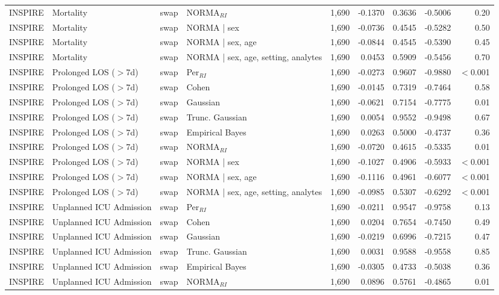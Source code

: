 \begin{table}[ht]
\begin{tabular}{ll l l r r r r r}
INSPIRE & Mortality & swap & NORMA$_{RI}$ & 1,690 & -0.1370 & 0.3636 & -0.5006 & 0.20 \\
INSPIRE & Mortality & swap & NORMA | sex & 1,690 & -0.0736 & 0.4545 & -0.5282 & 0.50 \\
INSPIRE & Mortality & swap & NORMA | sex, age & 1,690 & -0.0844 & 0.4545 & -0.5390 & 0.45 \\
INSPIRE & Mortality & swap & NORMA | sex, age, setting, analytes & 1,690 & 0.0453 & 0.5909 & -0.5456 & 0.70 \\
INSPIRE & Prolonged LOS ($>$7d) & swap & Per$_{RI}$ & 1,690 & -0.0273 & 0.9607 & -0.9880 & $<$0.001 \\
INSPIRE & Prolonged LOS ($>$7d) & swap & Cohen & 1,690 & -0.0145 & 0.7319 & -0.7464 & 0.58 \\
INSPIRE & Prolonged LOS ($>$7d) & swap & Gaussian & 1,690 & -0.0621 & 0.7154 & -0.7775 & 0.01 \\
INSPIRE & Prolonged LOS ($>$7d) & swap & Trunc. Gaussian & 1,690 & 0.0054 & 0.9552 & -0.9498 & 0.67 \\
INSPIRE & Prolonged LOS ($>$7d) & swap & Empirical Bayes & 1,690 & 0.0263 & 0.5000 & -0.4737 & 0.36 \\
INSPIRE & Prolonged LOS ($>$7d) & swap & NORMA$_{RI}$ & 1,690 & -0.0720 & 0.4615 & -0.5335 & 0.01 \\
INSPIRE & Prolonged LOS ($>$7d) & swap & NORMA | sex & 1,690 & -0.1027 & 0.4906 & -0.5933 & $<$0.001 \\
INSPIRE & Prolonged LOS ($>$7d) & swap & NORMA | sex, age & 1,690 & -0.1116 & 0.4961 & -0.6077 & $<$0.001 \\
INSPIRE & Prolonged LOS ($>$7d) & swap & NORMA | sex, age, setting, analytes & 1,690 & -0.0985 & 0.5307 & -0.6292 & $<$0.001 \\
INSPIRE & Unplanned ICU Admission & swap & Per$_{RI}$ & 1,690 & -0.0211 & 0.9547 & -0.9758 & 0.13 \\
INSPIRE & Unplanned ICU Admission & swap & Cohen & 1,690 & 0.0204 & 0.7654 & -0.7450 & 0.49 \\
INSPIRE & Unplanned ICU Admission & swap & Gaussian & 1,690 & -0.0219 & 0.6996 & -0.7215 & 0.47 \\
INSPIRE & Unplanned ICU Admission & swap & Trunc. Gaussian & 1,690 & 0.0031 & 0.9588 & -0.9558 & 0.85 \\
INSPIRE & Unplanned ICU Admission & swap & Empirical Bayes & 1,690 & -0.0305 & 0.4733 & -0.5038 & 0.36 \\
INSPIRE & Unplanned ICU Admission & swap & NORMA$_{RI}$ & 1,690 & 0.0896 & 0.5761 & -0.4865 & 0.01 \\

\end{tabular}
\end{table}

